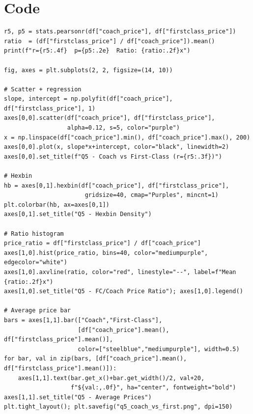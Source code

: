 \documentclass[12pt, a4paper]{report}
\begin{document}
\section{Code}

\begin{lstlisting}[style=python, caption={Python — Correlation test and coach vs.\ first-class plots}]
r5, p5 = stats.pearsonr(df["coach_price"], df["firstclass_price"])
ratio  = (df["firstclass_price"] / df["coach_price"]).mean()
print(f"r={r5:.4f}  p={p5:.2e}  Ratio: {ratio:.2f}x")

fig, axes = plt.subplots(2, 2, figsize=(14, 10))

# Scatter + regression
slope, intercept = np.polyfit(df["coach_price"], df["firstclass_price"], 1)
axes[0,0].scatter(df["coach_price"], df["firstclass_price"],
                  alpha=0.12, s=5, color="purple")
x = np.linspace(df["coach_price"].min(), df["coach_price"].max(), 200)
axes[0,0].plot(x, slope*x+intercept, color="black", linewidth=2)
axes[0,0].set_title(f"Q5 - Coach vs First-Class (r={r5:.3f})")

# Hexbin
hb = axes[0,1].hexbin(df["coach_price"], df["firstclass_price"],
                       gridsize=40, cmap="Purples", mincnt=1)
plt.colorbar(hb, ax=axes[0,1])
axes[0,1].set_title("Q5 - Hexbin Density")

# Ratio histogram
price_ratio = df["firstclass_price"] / df["coach_price"]
axes[1,0].hist(price_ratio, bins=40, color="mediumpurple", edgecolor="white")
axes[1,0].axvline(ratio, color="red", linestyle="--", label=f"Mean {ratio:.2f}x")
axes[1,0].set_title("Q5 - FC/Coach Price Ratio"); axes[1,0].legend()

# Average price bar
bars = axes[1,1].bar(["Coach","First-Class"],
                     [df["coach_price"].mean(), df["firstclass_price"].mean()],
                     color=["steelblue","mediumpurple"], width=0.5)
for bar, val in zip(bars, [df["coach_price"].mean(), df["firstclass_price"].mean()]):
    axes[1,1].text(bar.get_x()+bar.get_width()/2, val+20,
                   f"${val:,.0f}", ha="center", fontweight="bold")
axes[1,1].set_title("Q5 - Average Prices")
plt.tight_layout(); plt.savefig("q5_coach_vs_first.png", dpi=150)
\end{lstlisting}
\end{document}

